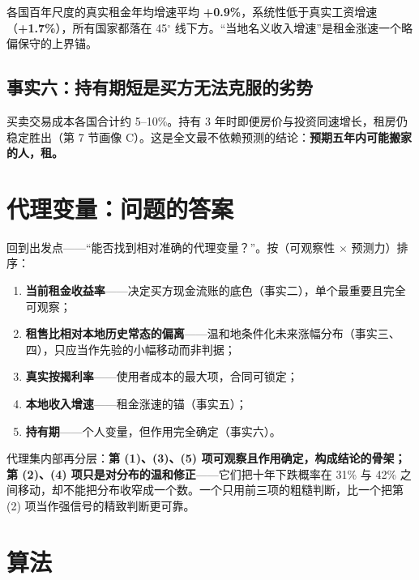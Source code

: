 \documentclass[11pt,a4paper]{ctexart}
\begin{document}
各国百年尺度的真实租金年均增速平均 \textbf{+0.9\%}，系统性低于真实工资增速（\textbf{+1.7\%}），所有国家都落在 45$^\circ$ 线下方。``当地名义收入增速''是租金涨速一个略偏保守的上界锚。

\subsection{事实六：持有期短是买方无法克服的劣势}

买卖交易成本各国合计约 5--10\%。持有 3 年时即便房价与投资同速增长，租房仍稳定胜出（第 7 节画像 C）。这是全文最不依赖预测的结论：\textbf{预期五年内可能搬家的人，租。}

\section{代理变量：问题的答案}

回到出发点——``能否找到相对准确的代理变量？''。按（可观察性 $\times$ 预测力）排序：

\begin{enumerate}\itemsep0.2em
\item \textbf{当前租金收益率}——决定买方现金流账的底色（事实二），单个最重要且完全可观察；
\item \textbf{租售比相对本地历史常态的偏离}——温和地条件化未来涨幅分布（事实三、四），只应当作先验的小幅移动而非判据；
\item \textbf{真实按揭利率}——使用者成本的最大项，合同可锁定；
\item \textbf{本地收入增速}——租金涨速的锚（事实五）；
\item \textbf{持有期}——个人变量，但作用完全确定（事实六）。
\end{enumerate}

代理集内部再分层：\textbf{第 (1)、(3)、(5) 项可观察且作用确定，构成结论的骨架；第 (2)、(4) 项只是对分布的温和修正}——它们把十年下跌概率在 31\% 与 42\% 之间移动，却不能把分布收窄成一个数。一个只用前三项的粗糙判断，比一个把第 (2) 项当作强信号的精致判断更可靠。

\section{算法}
\end{document}
